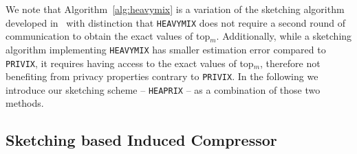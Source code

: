 \documentclass{article}
\newtheorem{lemma}{Lemma}
\begin{document}
We note that Algorithm~\ref{alg:heavymix} is a variation of the sketching algorithm developed in~\citet{ivkin2019communication} with distinction that \texttt{HEAVYMIX} does not require a second round of communication to obtain the exact values of top$_m$. 
Additionally, while a sketching algorithm implementing \texttt{HEAVYMIX} has smaller estimation error compared to \texttt{PRIVIX}, it requires having access to the exact values of top$_m$, therefore not benefiting from privacy properties contrary to \texttt{PRIVIX}. 
In the following we introduce our sketching scheme -- \texttt{HEAPRIX} -- as a combination of those two methods. 

\vspace{-0.05in}
\subsection{Sketching based Induced Compressor}
\vspace{-0.05in}
\end{document}
